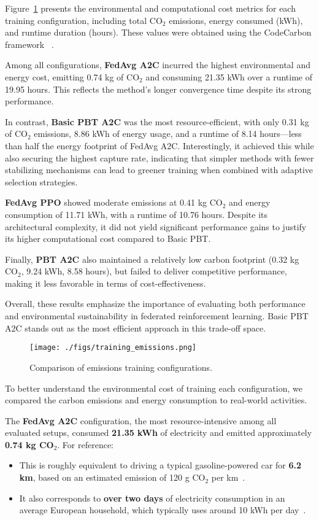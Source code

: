 \documentclass[12pt,a4paper,twoside,openany]{book}
\begin{document}
Figure~\ref{fig:training_emissions} presents the environmental and computational cost metrics for each training configuration, including total CO$_2$ emissions, energy consumed (kWh), and runtime duration (hours). These values were obtained using the CodeCarbon framework ~\cite{CodeCarbon}.

Among all configurations, \textbf{FedAvg A2C} incurred the highest environmental and energy cost, emitting 0.74 kg of CO$_2$ and consuming 21.35 kWh over a runtime of 19.95 hours. This reflects the method's longer convergence time despite its strong performance.

In contrast, \textbf{Basic PBT A2C} was the most resource-efficient, with only 0.31 kg of CO$_2$ emissions, 8.86 kWh of energy usage, and a runtime of 8.14 hours—less than half the energy footprint of FedAvg A2C. Interestingly, it achieved this while also securing the highest capture rate, indicating that simpler methods with fewer stabilizing mechanisms can lead to greener training when combined with adaptive selection strategies.

\textbf{FedAvg PPO} showed moderate emissions at 0.41 kg CO$_2$ and energy consumption of 11.71 kWh, with a runtime of 10.76 hours. Despite its architectural complexity, it did not yield significant performance gains to justify its higher computational cost compared to Basic PBT.

Finally, \textbf{PBT A2C} also maintained a relatively low carbon footprint (0.32 kg CO$_2$, 9.24 kWh, 8.58 hours), but failed to deliver competitive performance, making it less favorable in terms of cost-effectiveness.

Overall, these results emphasize the importance of evaluating both performance and environmental sustainability in federated reinforcement learning. Basic PBT A2C stands out as the most efficient approach in this trade-off space.

\begin{figure}[H]
\centering
\texttt{[image: ./figs/training\_emissions.png]}
\captionsetup{font=small}
\caption{Comparison of emissions training configurations.}
\label{fig:training_emissions}
\end{figure}

To better understand the environmental cost of training each configuration, we compared the carbon emissions and energy consumption to real-world activities.

The \textbf{FedAvg A2C} configuration, the most resource-intensive among all evaluated setups, consumed \textbf{21.35 kWh} of electricity and emitted approximately \textbf{0.74 kg CO$_2$}. For reference:
\begin{itemize}
  \item This is roughly equivalent to driving a typical gasoline-powered car for \textbf{6.2 km}, based on an estimated emission of 120 g CO$_2$ per km~\cite{EPAEmissions}.
  \item It also corresponds to \textbf{over two days} of electricity consumption in an average European household, which typically uses around 10 kWh per day~\cite{EurostatEnergy}.
\end{itemize}
\end{document}
